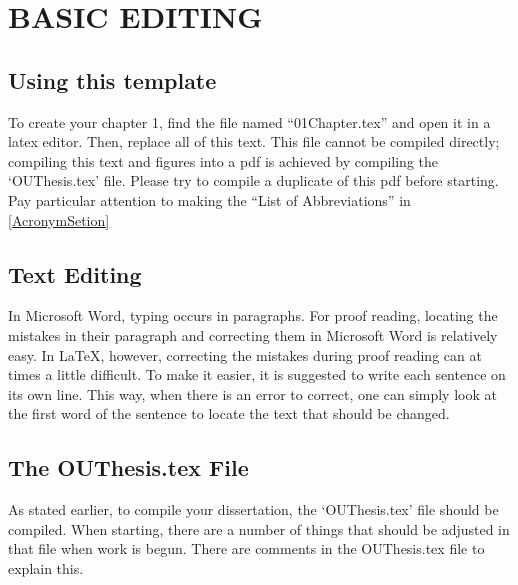 \chapter{BASIC EDITING}%

\section{Using this template}

To create your chapter 1, find the file named ``01Chapter.tex'' and open it in a latex editor. 
Then, replace all of this text. 
This file cannot be compiled directly; compiling this text and figures into a pdf is achieved by compiling the `OUThesis.tex' file.
Please try to compile a duplicate of this pdf before starting. 
Pay particular attention to making the ``List of Abbreviations'' in \autoref{AcronymSetion}

\section{Text Editing}

In Microsoft Word, typing occurs in paragraphs. 
For proof reading, locating the mistakes in their paragraph and correcting them in Microsoft Word is relatively easy. 
In LaTeX, however, correcting the mistakes during proof reading can at times a little difficult. 
To make it easier, it is suggested to write each sentence on its own line. 
This way, when there is an error to correct, one can simply look at the first word of the sentence to locate the text that should be changed.

\section{The OUThesis.tex File}

As stated earlier, to compile your dissertation, the `OUThesis.tex' file should be compiled. 
When starting, there are a number of things that should be adjusted in that file when work is begun.
There are comments in the OUThesis.tex file to explain this. 

